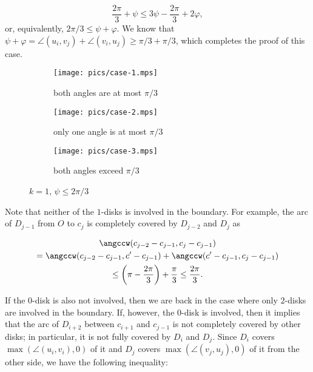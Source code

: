 \begin{enumerate}[label={\bf Case \arabic*: }, wide, labelwidth=!, labelindent=0pt]
$$\frac{2\pi}{3} + \psi \leq 3\psi - \frac{2\pi}{3} + 2\varphi,$$
or, equivalently, $2\pi/3\leq \psi + \varphi$.
We know that $\psi + \varphi = \angle(u_i, v_j) + \angle(v_i, u_j) \ge \pi/3 + \pi/3$, which completes the proof of this case.

\begin{figure}[h!]
    \centering
    \begin{subfigure}[t]{.3\textwidth}
    \texttt{[image: pics/case-1.mps]}
    \caption{both angles are at most $\pi/3$}
    \end{subfigure}
    \begin{subfigure}[t]{.3\textwidth}
    \texttt{[image: pics/case-2.mps]}
    \caption{only one angle is at most $\pi/3$}
    \end{subfigure}
    \begin{subfigure}[t]{.3\textwidth}
    \texttt{[image: pics/case-3.mps]}
    \caption{both angles exceed $\pi/3$}
    \end{subfigure}
    \caption{$k = 1$, $\psi\leq2\pi/3$}
\end{figure}



Note that neither of the $1$-disks is involved in the boundary. For example, the arc of $D_{j-1}$ from $O$ to $c_j$ is completely covered by $D_{j-2}$ and $D_j$ as

\begin{multline*}
\angccw(c_{j-2} - c_{j-1}, c_j - c_{j-1}) \\
= \angccw(c_{j-2} - c_{j-1}, c' - c_{j-1}) + \angccw(c' - c_{j-1}, c_j - c_{j-1}) \\
\leq \left(\pi - \frac{2\pi}{3}\right) + \frac{\pi}{3} \leq \frac{2\pi}{3}. 
\end{multline*}

If the $0$-disk is also not involved, then we are back in the case where only $2$-disks are involved in the boundary. If, however, the $0$-disk is involved, then it implies that the arc of $D_{i+2}$ between $c_{i+1}$ and $c_{j-1}$ is not completely covered by other disks; in particular, it is not fully covered by $D_i$ and $D_j$. Since $D_i$ covers $\max(\angle(u_i, v_i), 0)$ of it and $D_j$ covers $\max(\angle(v_j, u_j), 0)$ of it from the other side, we have the following inequality:


\end{enumerate}
